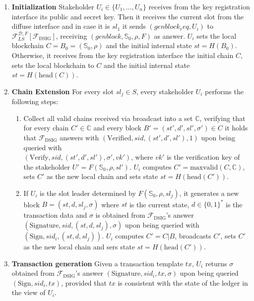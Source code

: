 \begin{enumerate}
    \item \textbf{Initialization} Stakeholder $U_i \in \{U_1, \dots, U_n\}$ receives from the key registration interface its public and secret key. Then it receives the current slot from the diffuse interface and in case it is $sl_1$ it sends $(genblock_req, U_i)$ to $\mathcal{F}_{LS}^{\mathcal{D},F}[\mathcal{F}_\text{DSIG}]$, receiving $(genblock,\mathbb{S}_0, \rho, F)$ as answer. $U_i$ sets the local blockchain $C= B_0 = (\mathbb{S}_0, \rho)$ and the initial internal state $st=H(B_0)$. Otherwise, it receives from the key registration interface the initial chain $C$, sets the local blockchain to $C$ and the initial internal state $st=H(\text{head}(C))$.
    
    \item \textbf{Chain Extension} For every slot $sl_j \in S$, every stakeholder $U_i$ performs the following steps:
    \begin{enumerate}
        \item Collect all valid chains received via broadcast into a set $\mathbb{C}$, verifying that for every chain $C'\in \mathbb{C}$ and every block $B'=(st',d',sl',\sigma') \in C$ it holds that $\mathcal{F}_\text{DSIG}$ answers with $(\text{Verified}, sid, (st',d',sl'),1)$ upon being queried with \\ $(\text{Verify}, sid, (st',d',sl'), \sigma', vk')$, where $vk'$ is the verification key of the stakeholder $U'=F(\mathbb{S}_0,\rho,sl')$. $U_i$ computes $C'=\text{maxvalid}(C, \mathbb{C})$, sets $C'$ as the new local chain and sets state $st=H(\text{head}(C'))$.
        \item If $U_i$ is the slot leader determined by $F(\mathbb{S}_0,\rho,sl_j)$, it generates a new block $B=(st,d,sl_j,\sigma)$ where $st$ is the current state, $d\in\{0,1\}^{*}$ is the transaction data and $\sigma$ is obtained from $\mathcal{F}_\text{DSIG}$'s answer $(\text{Signature}, sid, (st,d,sl_j), \sigma)$ upon being queried with $(\text{Sign}, sid_i, (st,d,sl_j))$. $U_i$ computes $C' = C|B$, broadcasts $C'$, sets $C'$ as the new local chain and sers state $st=H(\text{head}(C'))$.
    \end{enumerate}
    
    \item \textbf{Transaction generation} Given a transaction template $tx$, $U_i$ returns $\sigma$ obtained from $\mathcal{F}_\text{DSIG}$'s answer $(\text{Signature}, sid_i, tx, \sigma)$ upon being queried $(\text{Sign}, sid_i, tx)$, provided that $tx$ is consistent with the state of the ledger in the view of $U_i$.
\end{enumerate}


